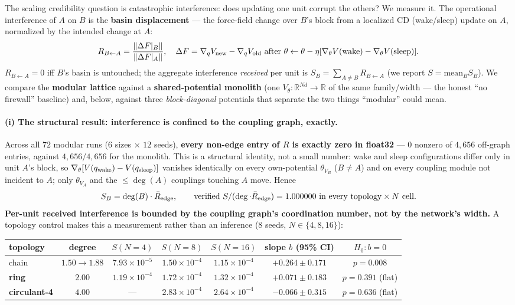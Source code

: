 \documentclass[11pt]{article}
\newcommand{\R}{\mathbb{R}}
\begin{document}
The scaling credibility question is catastrophic interference: does updating one unit corrupt the others? We measure it. The operational interference of $A$ on $B$ is the \textbf{basin displacement} --- the force-field change over $B$'s block from a localized CD (wake/sleep) update on $A$, normalized by the intended change at $A$:
\[ R_{B\leftarrow A}=\frac{\lVert\Delta F|_B\rVert}{\lVert\Delta F|_A\rVert},\quad \Delta F=\nabla_qV_{\rm new}-\nabla_qV_{\rm old}\ \text{after}\ \theta\leftarrow\theta-\eta[\nabla_\theta V(\text{wake})-\nabla_\theta V(\text{sleep})]. \]
$R_{B\leftarrow A}=0$ iff $B$'s basin is untouched; the aggregate interference \emph{received} per unit is $S_B=\sum_{A\ne B}R_{B\leftarrow A}$ (we report $S=\mathrm{mean}_B S_B$). We compare the \textbf{modular lattice} against a \textbf{shared-potential monolith} (one $V_\theta:\R^{Nd}\to\R$ of the same family/width --- the honest ``no firewall'' baseline) and, below, against three \emph{block-diagonal} potentials that separate the two things ``modular'' could mean.

\paragraph{(i) The structural result: interference is confined to the coupling graph, exactly.} Across all $72$ modular runs ($6$ sizes $\times$ $12$ seeds), \textbf{every non-edge entry of $R$ is exactly zero in float32} --- $0$ nonzero of $4{,}656$ off-graph entries, against $4{,}656/4{,}656$ for the monolith. This is a structural identity, not a small number: wake and sleep configurations differ only in unit $A$'s block, so $\nabla_\theta[V(q_{\rm wake})-V(q_{\rm sleep})]$ vanishes identically on every own-potential $\theta_{V_B}$ ($B\ne A$) and on every coupling module not incident to $A$; only $\theta_{V_A}$ and the $\le\deg(A)$ couplings touching $A$ move. Hence
\[ S_B=\deg(B)\cdot\bar R_{\rm edge}, \qquad\text{verified } S/(\deg\cdot\bar R_{\rm edge})=1.000000 \text{ in every topology}\times N \text{ cell.} \]
\textbf{Per-unit received interference is bounded by the coupling graph's coordination number, not by the network's width.} A topology control makes this a measurement rather than an inference ($8$ seeds, $N\in\{4,8,16\}$):

\begin{center}\footnotesize\setlength{\tabcolsep}{4pt}
\begin{tabular}{lcccccc}
\toprule
topology & degree & $S(N{=}4)$ & $S(N{=}8)$ & $S(N{=}16)$ & slope $b$ (95\% CI) & $H_0\!:b=0$ \\
\midrule
chain & $1.50\to1.88$ & $7.93\times10^{-5}$ & $1.50\times10^{-4}$ & $1.15\times10^{-4}$ & $+0.264\pm0.171$ & $p=0.008$ \\
\textbf{ring} & $2.00$ & $1.19\times10^{-4}$ & $1.72\times10^{-4}$ & $1.32\times10^{-4}$ & $\mathbf{+0.071\pm0.183}$ & $p=0.391$ (flat) \\
\textbf{circulant-4} & $4.00$ & --- & $2.83\times10^{-4}$ & $2.64\times10^{-4}$ & $-0.066\pm0.315$ & $p=0.636$ (flat) \\
\bottomrule
\end{tabular}
\end{center}
\end{document}
